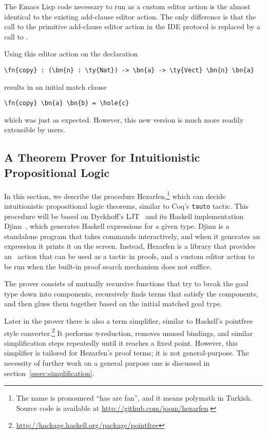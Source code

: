 The Emacs Lisp code necessary to run  as a custom editor
action is the almost identical to the existing add-clause editor
action.  The only difference is that the call to the primitive
add-clause editor action in the IDE protocol is replaced by a call to
.

Using this editor action on the declaration
\begin{Verbatim}
\fn{copy} : (\bn{n} : \ty{Nat}) -> \bn{a} -> \ty{Vect} \bn{n} \bn{a}
\end{Verbatim}
results in an initial match clause
\begin{Verbatim}
\fn{copy} \bn{a} \bn{b} = \hole{c}
\end{Verbatim}
which was just as expected. However, this new version is much more
readily extensible by users.

\subsection{A Theorem Prover for Intuitionistic Propositional Logic}\label{sec:hezarfen}

In this section, we describe the procedure Hezarfen,\footnote{The name is
  pronounced ``has are fan'', and it means
    polymath in Turkish. Source code is available at
    \url{http://github.com/joom/hezarfen}.} which can decide intuitionistic
propositional logic theorems, similar to Coq's \texttt{tauto} tactic.
This procedure will be based on Dyckhoff's LJT~\cite{ljt} and its Haskell
implementation Djinn~\cite{djinn}, which generates Haskell expressions
for a given type.
Djinn is a standalone program that takes commands
interactively, and when it generates an expression it prints it on the screen.
Instead, Hezarfen is a library that provides an \Elab\ action
that can be used as a tactic in proofs, and a custom editor action to be run
when the built-in proof search mechanism does not suffice.

The prover consists of mutually recursive functions that try to break
the goal type down into components, recursively finds terms that satisfy the
components, and then glues them together based on the initial matched goal
type.

Later in the prover there is also a term simplifier, similar to Haskell's
pointfree style
converter.\footnote{\url{http://hackage.haskell.org/package/pointfree}} It performs
$\eta$-reduction, removes unused  bindings, and similar
simplification steps repeatedly until it reaches a fixed point.
However, this simplifier is tailored for Hezarfen's proof terms; it is not
general-purpose.  The necessity of further work on a general purpose one is
discussed in section~\ref{sssec:simplification}.

